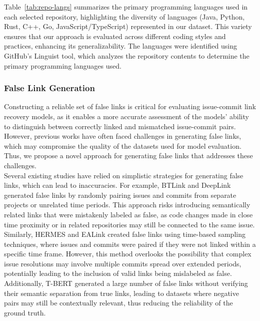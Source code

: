 Table~\ref{tab:repo-langs} summarizes the primary programming languages used in each selected repository, highlighting the diversity of languages (Java, Python, Rust, C++, Go, JavaScript/TypeScript) represented in our dataset. This variety ensures that our approach is evaluated across different coding styles and practices, enhancing its generalizability. The languages were identified using GitHub's Linguist tool, which analyzes the repository contents to determine the primary programming languages used.


\subsubsection*{False Link Generation}


Constructing a reliable set of false links is critical for evaluating issue-commit link recovery models, as it enables a more accurate assessment of the models' ability to distinguish between correctly linked and mismatched issue-commit pairs. However, previous works have often faced challenges in generating false links, which may compromise the quality of the datasets used for model evaluation. Thus, we propose a novel approach for generating false links that addresses these challenges.\\

\noindent
Several existing studies have relied on simplistic strategies for generating false links, which can lead to inaccuracies. For example, BTLink \cite{btlink} and DeepLink \cite{q1} generated false links by randomly pairing issues and commits from separate projects or unrelated time periods. This approach risks introducing semantically related links that were mistakenly labeled as false, as code changes made in close time proximity or in related repositories may still be connected to the same issue. Similarly, HERMES \cite{hermes} and EALink \cite{ealink} created false links using time-based sampling techniques, where issues and commits were paired if they were not linked within a specific time frame. However, this method overlooks the possibility that complex issue resolutions may involve multiple commits spread over extended periods, potentially leading to the inclusion of valid links being mislabeled as false. Additionally, T-BERT \cite{tbert} generated a large number of false links without verifying their semantic separation from true links, leading to datasets where negative pairs may still be contextually relevant, thus reducing the reliability of the ground truth.\\


